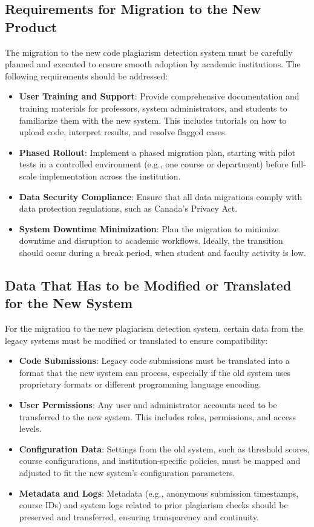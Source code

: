 \documentclass[12pt]{article}
\begin{document}
\subsection{Requirements for Migration to the New Product}
The migration to the new code plagiarism detection system must be carefully planned and executed to ensure smooth adoption by academic institutions. The following requirements should be addressed:
\begin{itemize}
    \item \textbf{User Training and Support}: Provide comprehensive documentation and training materials for professors, system administrators, and students to familiarize them with the new system. This includes tutorials on how to upload code, interpret results, and resolve flagged cases.
    \item \textbf{Phased Rollout}: Implement a phased migration plan, starting with pilot tests in a controlled environment (e.g., one course or department) before full-scale implementation across the institution.
    \item \textbf{Data Security Compliance}: Ensure that all data migrations comply with data protection regulations, such as Canada's Privacy Act.
    \item \textbf{System Downtime Minimization}: Plan the migration to minimize downtime and disruption to academic workflows. Ideally, the transition should occur during a break period, when student and faculty activity is low.
\end{itemize}
\subsection{Data That Has to be Modified or Translated for the New System}
For the migration to the new plagiarism detection system, certain data from the legacy systems must be modified or translated to ensure compatibility:
\begin{itemize}
    \item \textbf{Code Submissions}: Legacy code submissions must be translated into a format that the new system can process, especially if the old system uses proprietary formats or different programming language encoding.
    \item \textbf{User Permissions}: Any user and administrator accounts need to be transferred to the new system. This includes roles, permissions, and access levels.
    \item \textbf{Configuration Data}: Settings from the old system, such as threshold scores, course configurations, and institution-specific policies, must be mapped and adjusted to fit the new system’s configuration parameters.
    \item \textbf{Metadata and Logs}: Metadata (e.g., anonymous submission timestamps, course IDs) and system logs related to prior plagiarism checks should be preserved and transferred, ensuring transparency and continuity.
\end{itemize}
\end{document}

